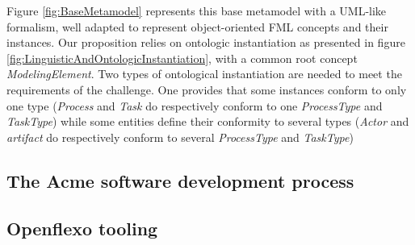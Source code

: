 Figure \ref{fig:BaseMetamodel} represents this base metamodel with a UML-like formalism, well adapted to represent object-oriented FML concepts and their instances. Our proposition relies on ontologic instantiation as presented in figure \ref{fig:LinguisticAndOntologicInstantiation}, with a common root concept \textit{ModelingElement}. Two types of ontological instantiation are needed to meet the requirements of the challenge. One provides that some instances conform to only one type (\textit{Process} and \textit{Task} do respectively conform to one \textit{ProcessType} and \textit{TaskType}) while some entities define their conformity to several types (\textit{Actor} and \textit{artifact} do respectively conform to several \textit{ProcessType} and \textit{TaskType})



\subsection{The Acme software development process}

\subsection{Openflexo tooling}



